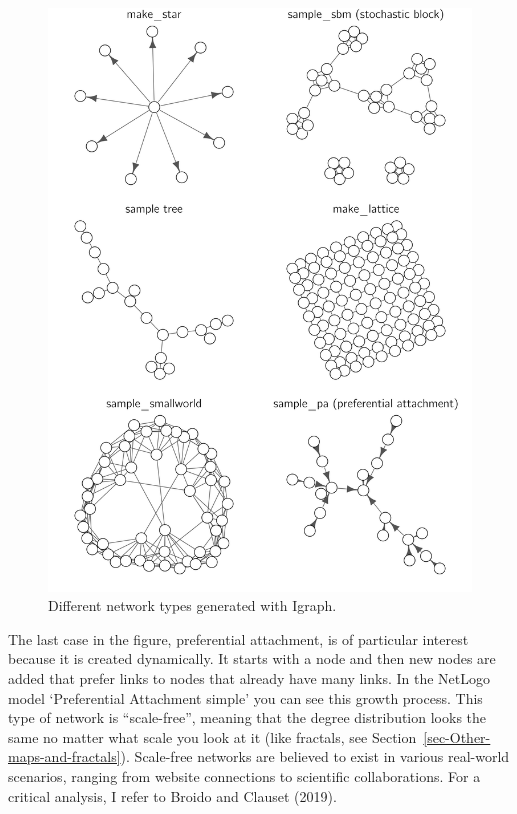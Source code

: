 \documentclass[
  a4paper,
  DIV=11,
  numbers=noendperiod,
  oneside]{scrreprt}
\begin{document}
\begin{figure}

{\centering \includegraphics{media/ch6/fig-ch6-img3-old-72.png}

}

\caption{\label{fig-ch6-img3-old-72}Different network types generated
with Igraph.}

\end{figure}

The last case in the figure, preferential attachment, is of particular
interest because it is created dynamically. It starts with a node and
then new nodes are added that prefer links to nodes that already have
many links. In the NetLogo model `Preferential Attachment simple' you
can see this growth process. This type of network is ``scale-free'',
meaning that the degree distribution looks the same no matter what scale
you look at it (like fractals, see
Section~\ref{sec-Other-maps-and-fractals}). Scale-free networks are
believed to exist in various real-world scenarios, ranging from website
connections to scientific collaborations. For a critical analysis, I
refer to Broido and Clauset (2019).
\end{document}
